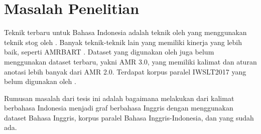 \section{Masalah Penelitian}

Teknik \crosslingual{} \amrparsing{} terbaru untuk Bahasa Indonesia adalah teknik oleh \textcite{putra2022} yang menggunakan teknik \gls{stog} oleh .
Banyak teknik-teknik lain yang memiliki kinerja \amrparsing{} yang lebih baik, seperti \gls{AMRBART} .
Dataset yang digunakan oleh \textcite{putra2022} juga belum menggunakan dataset terbaru, yakni AMR 3.0, yang memiliki kalimat dan aturan anotasi lebih banyak dari AMR 2.0.
Terdapat korpus paralel IWSLT2017  yang belum digunakan oleh \textcite{putra2022}.

Rumusan masalah dari tesis ini adalah bagaimana melakukan \amrparsing{} dari kalimat berbahasa Indonesia menjadi graf \AMR{} berbahasa Inggris dengan menggunakan dataset \AMR{} Bahasa Inggris, korpus paralel Bahasa Inggris-Indonesia, dan \multil{}  yang sudah ada.
